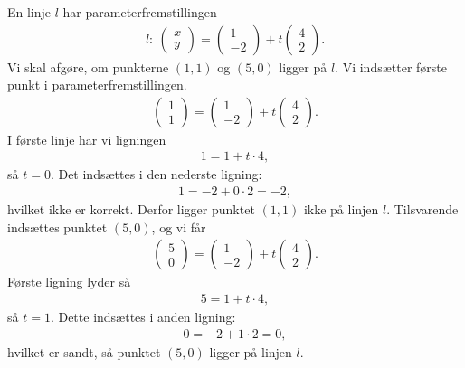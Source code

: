 \begin{exa}
	En linje $l$ har parameterfremstillingen
	\begin{align*}
		l: \  \begin{pmatrix} x \\ y \end{pmatrix} = 
		\begin{pmatrix} 1 \\ -2 \end{pmatrix} + t
		\begin{pmatrix}
			4\\2
		\end{pmatrix}.
	\end{align*}
	Vi skal afgøre, om punkterne $(1,1)$ og $(5,0)$ ligger på $l$. Vi indsætter første punkt i 
	parameterfremstillingen.
	\begin{align*}
		\begin{pmatrix}
			1 \\ 1
		\end{pmatrix} =
		\begin{pmatrix}
			1 \\ -2
		\end{pmatrix} + t
		\begin{pmatrix}
			4 \\ 2
		\end{pmatrix}.
	\end{align*}
	I første linje har vi ligningen
	\begin{align*}
		1 = 1 + t\cdot 4,
	\end{align*}
	så $t = 0$. Det indsættes i den nederste ligning:
	\begin{align*}
		1 = -2 + 0\cdot  2 = -2,
	\end{align*}
	hvilket ikke er korrekt. Derfor ligger punktet $(1,1)$ ikke på linjen $l$. 
	Tilsvarende indsættes punktet $(5,0)$, og vi får
	\begin{align*}
		\begin{pmatrix}
			5 \\ 0
		\end{pmatrix} = 
		\begin{pmatrix}
			1 \\ -2
		\end{pmatrix} + t
		\begin{pmatrix}
			4 \\ 2
		\end{pmatrix}.
	\end{align*}
	Første ligning lyder så
	\begin{align*}
		5 = 1 + t\cdot 4,
	\end{align*}
	så $t = 1$. Dette indsættes i anden ligning:
	\begin{align*}
		0 = -2 + 1\cdot 2 = 0,
	\end{align*}
	hvilket er sandt, så punktet $(5,0)$ ligger på linjen $l$. 
\end{exa}

